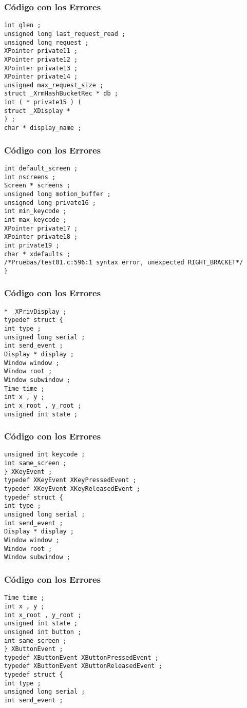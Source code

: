 \documentclass{beamer}
\begin{document}
\begin{frame}[fragile]
\frametitle{C\'odigo con los Errores}
\begin{verbatim}
int qlen ; 
unsigned long last_request_read ; 
unsigned long request ; 
XPointer private11 ; 
XPointer private12 ; 
XPointer private13 ; 
XPointer private14 ; 
unsigned max_request_size ; 
struct _XrmHashBucketRec * db ; 
int ( * private15 ) ( 
struct _XDisplay * 
) ; 
char * display_name ; 
\end{verbatim}
\end{frame}
\begin{frame}[fragile]
\frametitle{C\'odigo con los Errores}
\begin{verbatim}
int default_screen ; 
int nscreens ; 
Screen * screens ; 
unsigned long motion_buffer ; 
unsigned long private16 ; 
int min_keycode ; 
int max_keycode ; 
XPointer private17 ; 
XPointer private18 ; 
int private19 ; 
char * xdefaults ; 
/*Pruebas/test01.c:596:1 syntax error, unexpected RIGHT_BRACKET*/
} 
\end{verbatim}
\end{frame}
\begin{frame}[fragile]
\frametitle{C\'odigo con los Errores}
\begin{verbatim}
* _XPrivDisplay ; 
typedef struct { 
int type ; 
unsigned long serial ; 
int send_event ; 
Display * display ; 
Window window ; 
Window root ; 
Window subwindow ; 
Time time ; 
int x , y ; 
int x_root , y_root ; 
unsigned int state ; 
\end{verbatim}
\end{frame}
\begin{frame}[fragile]
\frametitle{C\'odigo con los Errores}
\begin{verbatim}
unsigned int keycode ; 
int same_screen ; 
} XKeyEvent ; 
typedef XKeyEvent XKeyPressedEvent ; 
typedef XKeyEvent XKeyReleasedEvent ; 
typedef struct { 
int type ; 
unsigned long serial ; 
int send_event ; 
Display * display ; 
Window window ; 
Window root ; 
Window subwindow ; 
\end{verbatim}
\end{frame}
\begin{frame}[fragile]
\frametitle{C\'odigo con los Errores}
\begin{verbatim}
Time time ; 
int x , y ; 
int x_root , y_root ; 
unsigned int state ; 
unsigned int button ; 
int same_screen ; 
} XButtonEvent ; 
typedef XButtonEvent XButtonPressedEvent ; 
typedef XButtonEvent XButtonReleasedEvent ; 
typedef struct { 
int type ; 
unsigned long serial ; 
int send_event ; 
\end{verbatim}
\end{frame}
\end{document}
